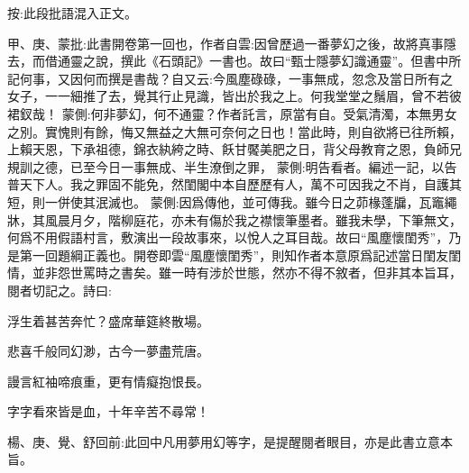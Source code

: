 
\begin{parag}
    \begin{note} \begin{subnote} 按:此段批語混入正文。\end{subnote}
        甲、庚、蒙批:此書開卷第一回也，作者自雲:因曾歷過一番夢幻之後，故將真事隱去，而借通靈之說，撰此《石頭記》一書也。故曰“甄士隱夢幻識通靈”。但書中所記何事，又因何而撰是書哉？自又云:今風塵碌碌，一事無成，忽念及當日所有之女子，一一細推了去，覺其行止見識，皆出於我之上。何我堂堂之鬚眉，曾不若彼裙釵哉！ 蒙側:何非夢幻，何不通靈？作者託言，原當有自。受氣清濁，本無男女之別。實愧則有餘，悔又無益之大無可奈何之日也！當此時，則自欲將已往所賴，上賴天恩，下承祖德，錦衣紈絝之時、飫甘饜美肥之日，背父母教育之恩，負師兄規訓之德，已至今日一事無成、半生潦倒之罪， 蒙側:明告看者。編述一記，以告普天下人。我之罪固不能免，然閨閣中本自歷歷有人，萬不可因我之不肖，自護其短，則一併使其泯滅也。 蒙側:因爲傳他，並可傳我。雖今日之茆椽蓬牖，瓦竈繩牀，其風晨月夕，階柳庭花，亦未有傷於我之襟懷筆墨者。雖我未學，下筆無文，何爲不用假語村言，敷演出一段故事來，以悅人之耳目哉。故曰“風塵懷閨秀”，乃是第一回題綱正義也。開卷即雲“風塵懷閨秀”，則知作者本意原爲記述當日閨友閨情，並非怨世罵時之書矣。雖一時有涉於世態，然亦不得不敘者，但非其本旨耳，閱者切記之。詩曰:
    \end{note}



    \begin{poem}
        \color{Mahogany}
        \begin{pl}浮生着甚苦奔忙？盛席華筵終散場。\end{pl}

        \begin{pl}悲喜千般同幻渺，古今一夢盡荒唐。\end{pl}

        \begin{pl}謾言紅袖啼痕重，更有情癡抱恨長。\end{pl}

        \begin{pl}字字看來皆是血，十年辛苦不尋常！\end{pl}
    \end{poem}

\end{parag}

\begin{parag}
    \begin{note}楊、庚、覺、舒回前:此回中凡用夢用幻等字，是提醒閱者眼目，亦是此書立意本旨。\end{note}

\end{parag}


